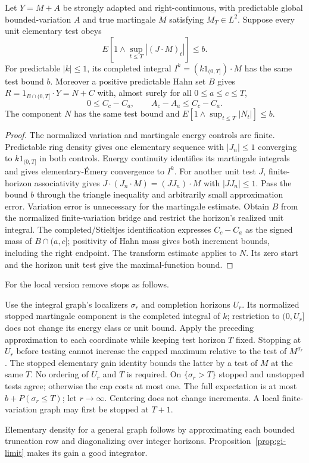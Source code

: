 \begin{proposition}
Let $Y=M+A$ be strongly adapted and right-continuous, with predictable global
bounded-variation $A$ and true martingale $M$ satisfying $M_T\in L^2$.
Suppose every unit elementary test obeys
\[
 E\left[1\wedge\sup_{t\leq T}|(J\cdot M)_t|\right]\leq b.
\]
For predictable $|k|\leq1$, its completed integral
$I^k=(k1_{(0,T]})\cdot M$ has the same test bound $b$.
Moreover a positive predictable Hahn set $B$ gives
$R=1_{B\cap(0,T]}\cdot Y=N+C$ with, almost surely for all $0\leq a\leq c\leq T$,
\[
 0\leq C_c-C_a,\qquad A_c-A_a\leq C_c-C_a.
\]
The component $N$ has the same test bound and
$E[1\wedge\sup_{t\leq T}|N_t|]\leq b$.
\end{proposition}
\begin{proof}
The normalized variation and martingale energy controls are finite.
Predictable ring density gives one elementary sequence with $|J_n|\leq1$
converging to $k1_{(0,T]}$ in both controls. Energy continuity identifies its
martingale integrals and gives elementary-Émery convergence to $I^k$.
For another unit test $J$, finite-horizon associativity gives
$J\cdot(J_n\cdot M)=(JJ_n)\cdot M$ with $|JJ_n|\leq1$.
Pass the bound $b$ through the triangle inequality and arbitrarily small
approximation error. Variation error is unnecessary for the martingale estimate.
Obtain $B$ from the normalized finite-variation bridge and restrict the
horizon's realized unit integral. The completed/Stieltjes identification
expresses $C_c-C_a$ as the signed mass of $B\cap(a,c]$; positivity of Hahn
mass gives both increment bounds, including the right endpoint.
The transform estimate applies to $N$. Its zero start and the horizon unit
test give the maximal-function bound.
\end{proof}

For the local version remove stops as follows.

Use the integral graph's localizers $\sigma_r$ and completion horizons $U_r$.
Its normalized stopped martingale component is the completed integral of
$k$; restriction to $(0,U_r]$ does not change its energy class or unit bound.
Apply the preceding approximation to each coordinate while keeping test
horizon $T$ fixed. Stopping at $U_r$ before testing cannot increase the capped
maximum relative to the test of $M^{\sigma_r}$. The stopped elementary gain
identity bounds the latter by a test of $M$ at the same $T$. No ordering of
$U_r$ and $T$ is required.
On $\{\sigma_r>T\}$ stopped and unstopped tests agree; otherwise the cap
costs at most one. The full expectation is at most
$b+P(\sigma_r\leq T)$; let $r\to\infty$. Centering does not change increments.
A local finite-variation graph may first be stopped at $T+1$.


Elementary density for a general graph follows by approximating each bounded truncation row and diagonalizing over integer horizons. Proposition~\ref{prop:gi-limit} makes its gain a good integrator.
